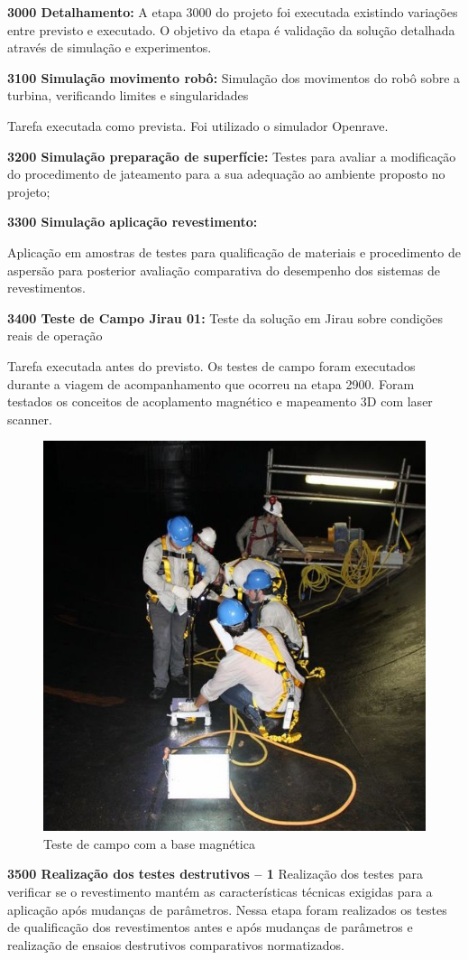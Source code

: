 \noindent
\textbf{3000 Detalhamento:} A etapa 3000 do projeto foi executada existindo
variações entre previsto e executado. O objetivo da etapa é validação da solução
detalhada através de simulação e experimentos.

\noindent
\textbf{3100 Simulação movimento robô:} 
Simulação dos movimentos do robô sobre a turbina, verificando limites e singularidades

Tarefa executada como prevista. Foi utilizado o simulador Openrave.  

\noindent
\textbf{3200 Simulação preparação de superfície:}
Testes para avaliar a modificação do procedimento de jateamento para a sua adequação ao ambiente proposto no projeto;

\noindent
\textbf{3300 Simulação aplicação revestimento:}

Aplicação em amostras de testes para qualificação de materiais e procedimento de aspersão para posterior avaliação comparativa do desempenho dos sistemas de revestimentos.


\noindent
\textbf{3400 Teste de Campo Jirau 01:} Teste da solução  em Jirau sobre
condições reais de operação

Tarefa executada antes do previsto. Os testes de campo foram executados durante
a viagem de acompanhamento que ocorreu na etapa 2900. Foram testados os
conceitos de acoplamento magnético e mapeamento 3D com laser scanner.
\begin{figure}
\centering
\includegraphics[width=0.6\columnwidth]{figs/base}
\caption{Teste de campo com a base  magnética}
\end{figure}

\noindent
\textbf{3500 Realização dos testes destrutivos – 1}
Realização dos testes para verificar se o revestimento mantém as 
características técnicas exigidas para a aplicação após mudanças de parâmetros. Nessa etapa foram realizados os testes de qualificação dos revestimentos antes e após mudanças de parâmetros e realização de ensaios destrutivos comparativos normatizados. 

